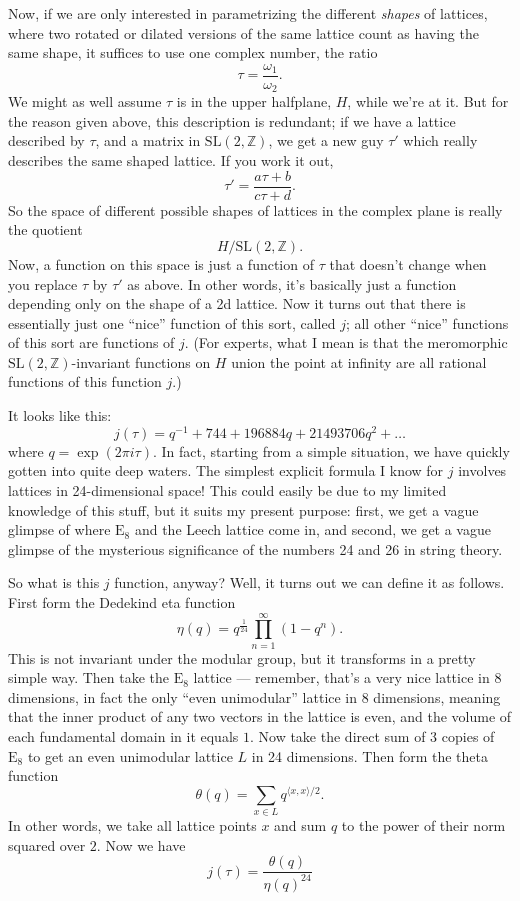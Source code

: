 \documentclass{article}
\begin{document}
Now, if we are only interested in parametrizing the different
\emph{shapes} of lattices, where two rotated or dilated versions of the
same lattice count as having the same shape, it suffices to use one
complex number, the ratio \[\tau=\frac{\omega_1}{\omega_2}.\] We might
as well assume \(\tau\) is in the upper halfplane, \(H\), while we're at
it. But for the reason given above, this description is redundant; if we
have a lattice described by \(\tau\), and a matrix in
\(\mathrm{SL}(2,\mathbb{Z})\), we get a new guy \(\tau'\) which really
describes the same shaped lattice. If you work it out,
\[\tau' = \frac{a\tau + b}{c\tau + d}.\] So the space of different
possible shapes of lattices in the complex plane is really the quotient
\[H/\mathrm{SL}(2,\mathbb{Z}).\] Now, a function on this space is just a
function of \(\tau\) that doesn't change when you replace \(\tau\) by
\(\tau'\) as above. In other words, it's basically just a function
depending only on the shape of a 2d lattice. Now it turns out that there
is essentially just one ``nice'' function of this sort, called \(j\);
all other ``nice'' functions of this sort are functions of \(j\). (For
experts, what I mean is that the meromorphic
\(\mathrm{SL}(2,\mathbb{Z})\)-invariant functions on \(H\) union the
point at infinity are all rational functions of this function \(j\).)

It looks like this:
\[j(\tau) = q^{-1} + 744 + 196884 q + 21493706 q^2 + \ldots\] where
\(q = \exp(2\pi i\tau)\). In fact, starting from a simple situation, we
have quickly gotten into quite deep waters. The simplest explicit
formula I know for \(j\) involves lattices in 24-dimensional space! This
could easily be due to my limited knowledge of this stuff, but it suits
my present purpose: first, we get a vague glimpse of where
\(\mathrm{E}_8\) and the Leech lattice come in, and second, we get a
vague glimpse of the mysterious significance of the numbers 24 and 26 in
string theory.

So what is this \(j\) function, anyway? Well, it turns out we can define
it as follows. First form the Dedekind eta function
\[\eta(q) = q^{\frac{1}{24}}\prod_{n=1}^\infty(1-q^n).\] This is not
invariant under the modular group, but it transforms in a pretty simple
way. Then take the \(\mathrm{E}_8\) lattice --- remember, that's a very
nice lattice in 8 dimensions, in fact the only ``even unimodular''
lattice in 8 dimensions, meaning that the inner product of any two
vectors in the lattice is even, and the volume of each fundamental
domain in it equals \(1\). Now take the direct sum of 3 copies of
\(\mathrm{E}_8\) to get an even unimodular lattice \(L\) in 24
dimensions. Then form the theta function
\[\theta(q) = \sum_{x\in L}q^{\langle x,x\rangle/2}.\] In other words,
we take all lattice points \(x\) and sum \(q\) to the power of their
norm squared over \(2\). Now we have
\[j(\tau) = \frac{\theta(q)}{\eta(q)^24}\]
\end{document}
